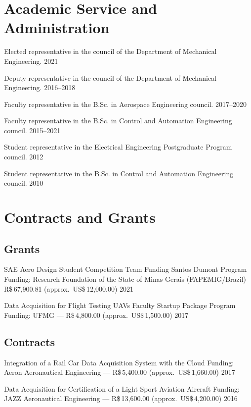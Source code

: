 \documentclass[a4paper, 11pt, oneside]{memoir}
\begin{document}
\section{Academic Service and Administration}
\begin{shortdesc} 
\item {%
  Elected representative in the council of the Department of Mechanical 
  Engineering.%
} \hfill {2021}
\item {%
  Deputy representative in the council of the Department of Mechanical 
  Engineering.%
} \hfill {2016--2018}
\item {%
  Faculty representative in the B.Sc. in Aerospace  Engineering council.
} \hfill {2017--2020}
\item {%
  Faculty representative in the B.Sc. in Control and Automation Engineering
  council.
} \hfill {2015--2021}
\item {%
  Student representative in the Electrical Engineering 
  Postgraduate Program council.
} \hfill {2012}
\item {%
  Student representative in the B.Sc. in Control and Automation Engineering
  council.
} \hfill {2010}
\end{shortdesc}

\section{Contracts and Grants}
\subsection{Grants}
\begin{shortdesc} 
\item {SAE Aero Design Student Competition Team Funding}
{Santos Dumont Program}
{ \newline Funding: 
  Research Foundation of the State of Minas Gerais (FAPEMIG/Brazil)
  \newline
  R\$\,67,900.81 (approx.\ US\$\,12,000.00)
}{}{}
 \hfill {2021}

\item {Data Acquisition for Flight Testing UAVs}
{Faculty Startup Package Program}
{\newline Funding: UFMG --- R\$\,4,800.00 (approx.\ US\$\,1,500.00)}{}{}
\hfill {2017}
\end{shortdesc}

\subsection{Contracts}
\begin{shortdesc} 
\item {Integration of a Rail Car Data Acquisition System with the Cloud}
{}{\newline Funding: Aeron Aeronautical Engineering ---
  R\$\,5,400.00 (approx.\ US\$\,1,660.00)}{}{}
 \hfill {2017}

\item 
{Data Acquisition for Certification of a Light Sport Aviation Aircraft}{}
{\newline Funding: JAZZ Aeronautical Engineering --- 
 R\$\,13,600.00 (approx.\ US\$\,4,200.00)}{}{}
\hfill {2016}
\end{shortdesc}
\end{document}
